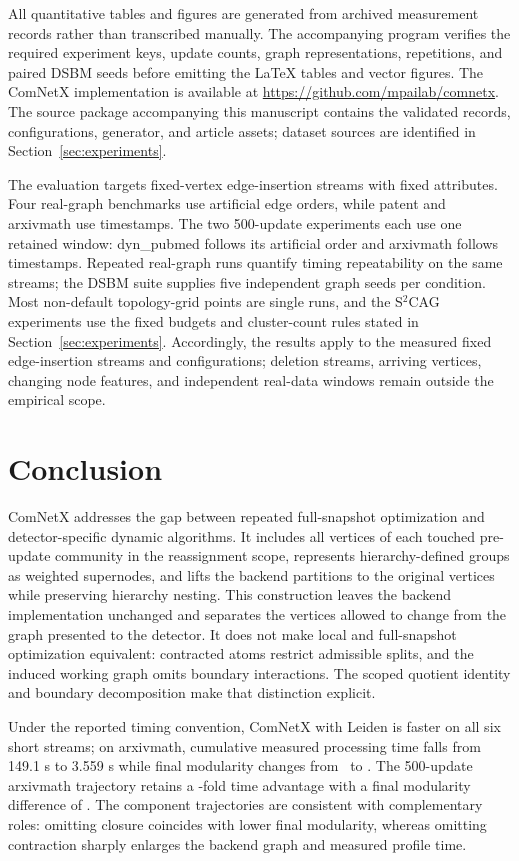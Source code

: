 \documentclass{ieeeaccess}
\begin{document}
All quantitative tables and figures are generated from archived measurement
records rather than transcribed manually. The accompanying program verifies
the required experiment keys, update counts, graph representations,
repetitions, and paired DSBM seeds before emitting the LaTeX tables and vector
figures. The ComNetX implementation is available at
\url{https://github.com/mpailab/comnetx}. The source package accompanying this
manuscript contains the validated records, configurations, generator, and
article assets; dataset sources are identified in
Section~\ref{sec:experiments}.

The evaluation targets fixed-vertex edge-insertion streams with fixed
attributes. Four real-graph benchmarks use artificial edge orders, while
patent and arxivmath use timestamps. The two 500-update experiments each use
one retained window: dyn\_pubmed follows its artificial order and arxivmath
follows timestamps. Repeated real-graph runs quantify timing repeatability on
the same streams; the DSBM suite supplies five independent graph seeds per
condition. Most non-default topology-grid points are single runs, and the
S$^2$CAG experiments use the fixed budgets and cluster-count rules stated in
Section~\ref{sec:experiments}. Accordingly, the results apply to the measured
fixed edge-insertion streams and configurations; deletion streams, arriving
vertices, changing node features, and independent real-data windows remain
outside the empirical scope.

\section{Conclusion}
\label{sec:conclusion}

ComNetX addresses the gap between repeated full-snapshot optimization and
detector-specific dynamic algorithms. It includes all vertices of each touched
pre-update community in the reassignment scope, represents hierarchy-defined
groups as weighted supernodes, and lifts the backend partitions to the original
vertices while preserving hierarchy nesting. This construction leaves the
backend implementation unchanged and separates the vertices allowed to change
from the graph presented to the detector. It does not make local and
full-snapshot optimization equivalent: contracted atoms restrict admissible
splits, and the induced working graph omits boundary interactions. The scoped
quotient identity and boundary decomposition make that distinction explicit.

Under the reported timing convention, ComNetX with Leiden is faster on all six
short streams; on arxivmath, cumulative measured processing time falls from
149.1 s to 3.559 s
while final modularity changes from \ArxivShortFullQ\ to \ArxivShortLocalQ.
The 500-update arxivmath trajectory retains a \ArxivLongSpeedup-fold time
advantage with a final modularity difference of \ArxivLongQGap. The component
trajectories are consistent with complementary roles: omitting closure
coincides with lower final modularity, whereas omitting contraction sharply
enlarges the backend graph and measured profile time.
\end{document}
